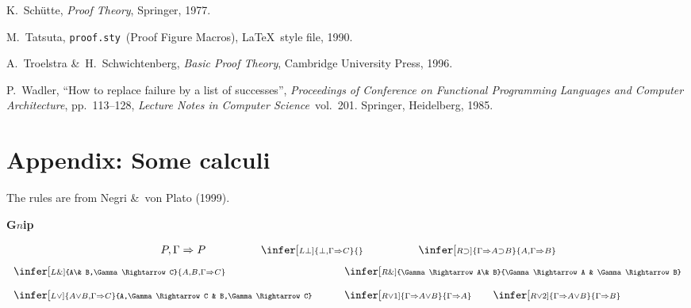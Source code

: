K.\ Sch\"utte, 
{\em Proof Theory}, Springer, 1977.

M.\ Tatsuta,
{\tt proof.sty}\ (Proof Figure Macros), \LaTeX\ style file, 1990.

A.\ Troelstra \&\ H.\ Schwichtenberg,
{\em Basic Proof Theory},
Cambridge University Press,
1996.

P.\ Wadler,
``How to replace failure by a list of successes'',
{\em Proceedings of Conference on Functional Programming
Languages and Computer Architecture}, pp.\ 113--128, 
{\em Lecture Notes in Computer Science}\ vol.\ 201.
Springer, Heidelberg, 1985.


\newpage




\section*{Appendix: Some calculi}

The rules are from Negri \&\ von Plato (1999).

\newcommand{\him}{\supset}
\newcommand{\seq}{\Rightarrow}
\newcommand{\himmih}{\supset \subset}
\newcommand{\dotseq}{\stackrel{\stackrel{\vdots}{ \ }}{\Rightarrow}}


\newcommand{\noin}{\noindent}
\newcommand{\vsk}{\vskip 5pt}
\newcommand{\npar}{\vskip 5pt \noindent}
\newcommand{\tbf}{\textbf}
\newcommand{\Gm}{\Gamma}
\newcommand{\Dlt}{\Delta}
\newcommand{\eps}{\mbox{\scriptsize $\ \in \ $}}
\newcommand{\nleqs}{\mbox{\scriptsize $\ \nleqslant\ $}}
\newcommand{\less}{\mbox{\scriptsize $\ < \ $}}
\newcommand{\neqs}{\mbox{\scriptsize $\ \neq \ $}}
\newcommand{\eqs}{\mbox{\scriptsize $\ = \ $}}

\centerline{\mbox{{\bf G$n$ip}}}
\[
\begin{array}{lll}
\qquad
P,\Gamma\seq P  
\qquad\qquad
&
\infer[\scriptstyle L\bot]{\bot,\Gamma\seq C}{}
\qquad\qquad
&
\infer[\scriptstyle R\him]{\Gamma\seq A\him B}{A,\Gamma\seq B } 
\end{array}
\]
\[
\begin{array}{ll}
\infer[\scriptstyle L\&]{A\& B,\Gamma\seq C}{A,B,\Gamma\seq C}
\qquad\qquad
&\infer[\scriptstyle R\&]{\Gamma\seq A\& B}{\Gamma\seq A & \Gamma\seq B}\\*[10pt]
\infer[\scriptstyle L\vee]{A\vee B,\Gamma\seq C}{A,\Gamma\seq C & B,\Gamma\seq C}
\qquad
&\infer[\scriptstyle R\vee1]{\Gamma\seq A\vee B}{\Gamma\seq A} \qquad
\infer[\scriptstyle R\vee2]{\Gamma\seq A\vee B}{\Gamma\seq B}
\end{array}
\]

